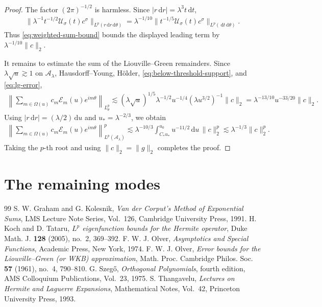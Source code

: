 \documentclass[10pt,a4paper]{amsart}
\numberwithin{equation}{section}
\newcommand{\dd}{\,\mathrm d}
\newcommand{\norm}[1]{\lVert #1\rVert}
\begin{document}
\begin{proof}
The factor \((2\pi)^{-1/2}\) is harmless. Since
\(|r\dd r|=\lambda^3t\dd t\),
\[
 \begin{aligned}
 \norm{\lambda^{-1}t^{-1/2}
 \mathcal U_\sigma(t)c^\sigma}_{L^p(r\dd r\dd\theta)}=\lambda^{-1/10}
 \norm{t^{-1/5}\mathcal U_\sigma(t)c^\sigma}_{L^p(\dd t\dd\theta)}.
 \end{aligned}
\]
Thus \eqref{eq:weighted-sum-bound} bounds the displayed leading term by
\(\lambda^{-1/10}\norm c_2\).

It remains to estimate the sum of the Liouville--Green remainders. Since
\(\lambda\sqrt u\gtrsim1\) on \(\mathcal A_\lambda\), Hausdorff--Young,
H\"older, \eqref{eq:below-threshold-support}, and
\eqref{eq:lg-error},
\[
 \begin{aligned}
 \left\|
 \sum_{m\in\Omega(u)}c_m\mathcal E_m(u)e^{im\theta}
 \right\|_{L_\theta^p}\lesssim
 (\lambda\sqrt u)^{1/5}
 \lambda^{-1/2}u^{-1/4}(\lambda u^{3/2})^{-1}\norm c_2
 =\lambda^{-13/10}u^{-33/20}\norm c_2.
 \end{aligned}
\]
Using \(|r\dd r|=(\lambda/2)\dd u\) and \(u_*=\lambda^{-2/3}\), we obtain
\[
 \begin{aligned}
 \left\|
 \sum_{m\in\Omega(u)}c_m\mathcal E_m(u)e^{im\theta}
 \right\|_{L^p(\mathcal A_\lambda)}^p
\lesssim
 \lambda^{-10/3}\int_{C_*u_*}^{u_0}u^{-11/2}\dd u\,\norm c_2^p
 \lesssim\lambda^{-1/3}\norm c_2^p.
 \end{aligned}
\]
Taking the \(p\)-th root and using \(\norm c_2=\norm g_2\) completes the
proof.
\end{proof}

\section{The remaining  modes}\label{sec:complementary}


\begin{thebibliography}{99}
 S. W. Graham and G. Kolesnik, \emph{Van der Corput's Method of Exponential Sums}, LMS Lecture Note Series, Vol.~126, Cambridge University Press, 1991.
 H. Koch and D. Tataru, \emph{\(L^p\) eigenfunction bounds for the Hermite operator}, Duke Math. J. \textbf{128} (2005), no.~2, 369--392.
 F. W. J. Olver, \emph{Asymptotics and Special Functions}, Academic Press, New York, 1974.
 F. W. J. Olver, \emph{Error bounds for the Liouville--Green (or WKB) approximation}, Math. Proc. Cambridge Philos. Soc. \textbf{57} (1961), no.~4, 790--810.
 G. Szeg\H{o}, \emph{Orthogonal Polynomials}, fourth edition, AMS Colloquium Publications, Vol.~23, 1975.
 S. Thangavelu, \emph{Lectures on Hermite and Laguerre Expansions}, Mathematical Notes, Vol.~42, Princeton University Press, 1993.
\end{thebibliography}
\end{document}
